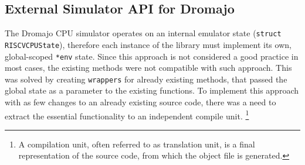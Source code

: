 \pagebreak

\subsection{External Simulator API for Dromajo}

The Dromajo CPU simulator operates on an internal emulator state (\texttt{struct RISCVCPUState}), therefore each
instance of the library must implement its own, global-scoped \texttt{*env} state. Since this approach is not considered
a good practice in most cases, the existing methods were not compatible with such approach. This was solved by
creating \texttt{wrappers} for already existing methods, that passed the global state as a parameter to the existing
functions. To implement this approach with as few changes to an already existing source code, there was a need to
extract the essential functionality to an independent compile unit.%
\footnote{A compilation unit, often referred to as translation unit, is a final representation of the source code,
from which the object file is generated.}

